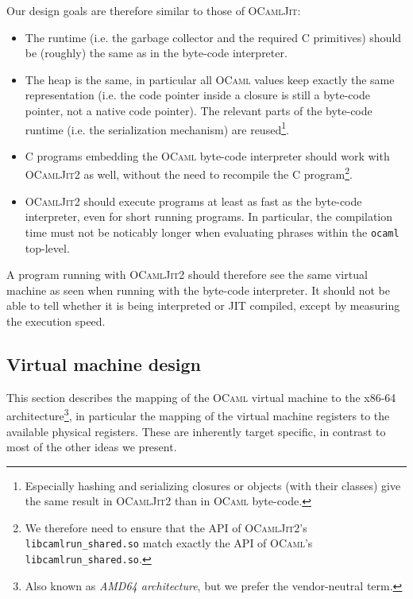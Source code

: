 \documentclass[a4paper]{acm_proc_article-sp}
\begin{document}
Our design goals are therefore similar to those of \textsc{OCamlJit}:
\begin{itemize}
\item The runtime (i.e. the garbage collector and the required C primitives) should be 
  (roughly) the same as in the byte-code interpreter.
\item The heap is the same, in particular all \textsc{OCaml} values keep exactly the same representation
  (i.e. the code pointer inside a closure is still a byte-code pointer, not a native code pointer). The
  relevant parts of the byte-code runtime (i.e. the serialization mechanism) are reused\footnote{Especially
    hashing and serializing closures or objects (with their classes) give the same result
    in \textsc{OCamlJit2} than in \textsc{OCaml} byte-code.}.
\item C programs embedding the \textsc{OCaml} byte-code interpreter should work with \textsc{OCamlJit2}
  as well, without the need to recompile the C program\footnote{We therefore need to ensure that the
    API of \textsc{OCamlJit2}'s \texttt{libcamlrun\_shared.so} match exactly the API of \textsc{OCaml}'s
    \texttt{libcamlrun\_shared.so}.}.
\item \textsc{OCamlJit2} should execute programs at least as fast as the byte-code interpreter,
  even for short running programs. In particular, the compilation time must not be noticably
  longer when evaluating phrases within the \texttt{ocaml} top-level.
\end{itemize}
A program running with \textsc{OCamlJit2} should therefore see the same virtual machine as seen when
running with the byte-code interpreter. It should not be able to tell whether it is being interpreted
or JIT compiled, except by measuring the execution speed.

\subsection{Virtual machine design} \label{subsection:Virtual_machine_design}

This section describes the mapping of the \textsc{OCaml} virtual machine to the x86-64 architecture\footnote{
Also known as \emph{AMD64 architecture}, but we prefer the vendor-neutral term.},
in particular the mapping of the virtual machine registers to the available physical registers. These
are inherently target specific, in contrast to most of the other ideas we present.
\end{document}
